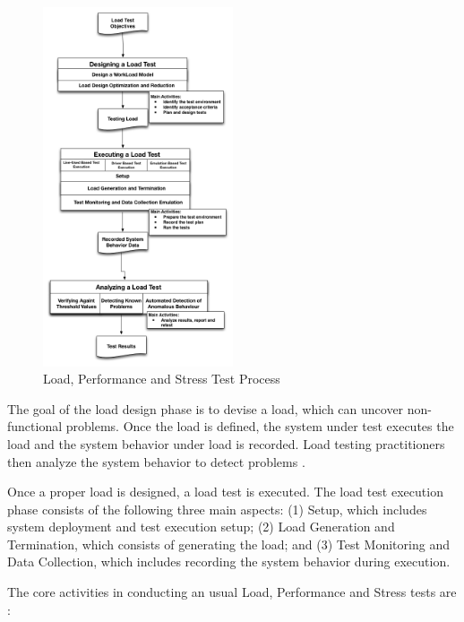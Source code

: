 \documentclass[review]{elsarticle}
\begin{document}
\begin{figure}[!ht]
\centering
\includegraphics[width=0.5\textwidth]{./images/testprocess.png}
\caption{Load, Performance and Stress Test Process \cite{Jiang2010}\cite{Erinle2013}}
\label{fig:testprocess}
\end{figure}


The goal of the load design phase is to devise a load, which can uncover non-functional problems. Once the load is defined, the system under test executes the load and the system behavior under load is recorded. Load testing practitioners then analyze the system behavior to detect problems \cite{Jiang2010}. 

Once a proper load is designed, a load test is executed. The load test execution phase consists of the following three main aspects: (1) Setup, which includes system deployment and test execution setup; (2) Load Generation and Termination, which consists of generating the load; and (3) Test Monitoring and Data Collection, which includes recording the system behavior during execution\cite{Jiang2010}. 

The core activities in conducting an usual Load, Performance and Stress tests are \cite{Erinle2013}: 
\end{document}

